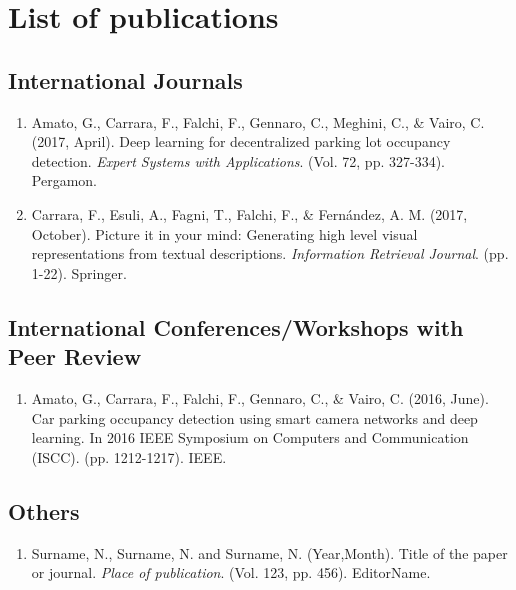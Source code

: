 \chapter*{List of publications}


\section*{International Journals}
\begin{enumerate}
    \item Amato, G., Carrara, F., Falchi, F., Gennaro, C., Meghini, C., & Vairo, C. (2017, April). Deep learning for decentralized parking lot occupancy detection. \emph{Expert Systems with Applications}. (Vol. 72, pp. 327-334). Pergamon.
    \item Carrara, F., Esuli, A., Fagni, T., Falchi, F., & Fernández, A. M. (2017, October). Picture it in your mind: Generating high level visual representations from textual descriptions. \emph{Information Retrieval Journal}. (pp. 1-22). Springer.
    
\end{enumerate}

\section*{International Conferences/Workshops with Peer Review}
\begin{enumerate}
    \item Amato, G., Carrara, F., Falchi, F., Gennaro, C., & Vairo, C. (2016, June). Car parking occupancy detection using smart camera networks and deep learning. In 2016 IEEE Symposium on Computers and Communication (ISCC). (pp. 1212-1217). IEEE.
\end{enumerate}

\section*{Others}
\begin{enumerate}
    \item Surname, N., Surname, N. and Surname, N. (Year,Month). Title of the paper or journal. \emph{Place of publication}. (Vol. 123, pp. 456). EditorName.
\end{enumerate}